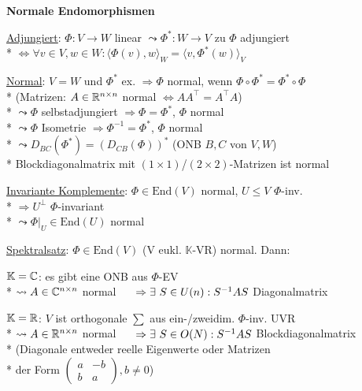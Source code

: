 \textbf{Normale Endomorphismen}
\begin{items}
	\item \underline{Adjungiert}: \( \Phi: V \to W \) linear \( \leadsto \Phi^\ast: W \to V \) zu \( \Phi \) adjungiert
		\\*
		\( \Leftrightarrow \forall v \in V, w \in W: \langle \Phi(v),w \rangle_W = \langle v,\Phi^\ast(w) \rangle_V \)
	\item \underline{Normal}: \( V = W \) und \( \Phi^\ast \) ex. \( \Rightarrow \Phi \) normal, wenn \( \Phi \circ \Phi^\ast = \Phi^\ast \circ \Phi \)
		\\*
		(Matrizen: \( A \in \mathbb{R}^{n \times n} \) normal \( \Leftrightarrow AA^\top  = A^\top A \))
		\\*
		\( \leadsto \Phi \) selbstadjungiert \( \Rightarrow \Phi = \Phi^\ast \), \( \Phi \) normal
		\\*
		\( \leadsto \Phi \) Isometrie \( \Rightarrow \Phi^{-1} = \Phi^\ast \), \( \Phi \) normal
		\\*
		\( \leadsto D_{BC}(\Phi^\ast) = \left(D_{CB}(\Phi)\right)^\ast \) (ONB \( B,C \) von \( V,W \))
		\\*
		Blockdiagonalmatrix mit \( (1 \times 1) \)/\( (2 \times 2) \)-Matrizen ist normal
	\item \underline{Invariante Komplemente}: \( \Phi \in \text{End}(V) \) normal, \( U \leq V \) \( \Phi \)-inv.
		\\*
		\( \Rightarrow U^\perp \) \( \Phi \)-invariant
		\\*
		\( \leadsto \Phi|_U \in \text{End}(U) \) normal
	\item \underline{Spektralsatz}: \( \Phi \in \text{End}(V) \) (V eukl. \( \mathbb{K} \)-VR) normal. Dann:
		\begin{enumeration}
			\item \( \mathbb{K}=\mathbb{C} \): es gibt eine ONB aus \( \Phi \)-EV
				\\*
				\( \leadsto A \in \mathbb{C}^{n \times n} \) normal \( \\* \phantom{xx} \Rightarrow \exists \ S \in U(n): S^{-1}AS \) Diagonalmatrix
			\item \( \mathbb{K}=\mathbb{R} \): \( V \) ist orthogonale \( \sum \) aus ein-/zweidim. \( \Phi \)-inv. UVR
				\\*
				\( \leadsto A \in \mathbb{R}^{n \times n} \) normal \( \\* \phantom{xx} \Rightarrow \exists \ S \in O(N): S^{-1}AS \) Blockdiagonalmatrix \\* \phantom{xx} (Diagonale entweder reelle Eigenwerte oder Matrizen \\* \phantom{xx} der Form \( \left( \begin{smallmatrix}
					a & -b \\
					b & a
				\end{smallmatrix} \right), b \neq 0 \))
		\end{enumeration}
\end{items}
